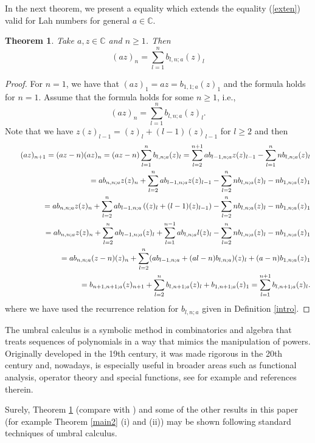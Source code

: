 \documentclass[a4paper,12pt]{amsart}
\def\CC{\mathbb C}
\def\CC{\mathbb C}
\newtheorem{theorem}[thm]{Theorem}
\theoremstyle{definition}
\theoremstyle{remark}
\begin{document}
In the next theorem, we present a equality which extends the equality (\ref{exten}) valid for Lah numbers for general $a\in \CC.$


\begin{theorem}\label{main} Take $a,z\in \CC$ and $n\ge 1$. Then
$$
(az)_n= \sum_{l=1}^n b_{l,n;a}(z)_l
$$

\end{theorem}

\begin{proof}
For $n=1$, we have that $(az)_1=az=b_{1,1;a}(z)_1$ and the formula holds for $n=1$. Assume that the formula holds for some $n \ge 1$, i.e.,
\[
(az)_n= \sum_{l=1}^{n} b_{l,n;a} (z)_l.
\]
Note that we have $z(z)_{l-1}=(z)_l+(l-1)(z)_{l-1}$ for $l\ge 2$ and then
\begin{eqnarray*}
&\quad&(az)_{n+1}= (az-n)(az)_n=  ( a z-n) \sum_{l=1}^{n} b_{l,n;a} (z)_l=  \sum_{l=2}^{n+1} a b_{l-1,n;a}z (z)_{l-1}-\sum_{l=1}^{n} n b_{l,n;a} (z)_l \cr
&\quad&= a b_{n,n;a}z(z)_n+ \sum_{l=2}^{n} a b_{l-1,n;a}z (z)_{l-1}-\sum_{l=2}^{n} n b_{l,n;a} (z)_l -nb_{1,n;a} (z)_1\cr
&\quad&= a b_{n,n;a}z(z)_n+ \sum_{l=2}^{n} a b_{l-1,n;a}\left((z)_l+(l-1)(z)_{l-1}\right)-\sum_{l=2}^{n} n b_{l,n;a} (z)_l -nb_{1,n;a} (z)_1\cr
&\quad&= a b_{n,n;a}z(z)_n+ \sum_{l=2}^{n} a b_{l-1,n;a}(z)_l + \sum_{l=1}^{n-1}a b_{l,n;a} l(z)_{l}-\sum_{l=2}^{n} n b_{l,n;a} (z)_l -nb_{1,n;a} (z)_1\cr
&\quad&= a b_{n,n;a}(z-n)(z)_n+ \sum_{l=2}^{n}  (ab_{l-1,n;a} +(al-n) b_{l,n;a} )(z)_{l}+(a -n)b_{1,n;a} (z)_1\cr
&\quad&=  b_{n+1,n+1;a}(z)_{n+1}+ \sum_{l=2}^{n}  b_{l,n+1;a}(z)_{l}+b_{1,n+1;a} (z)_1= \sum_{l=1}^{n+1} b_{l,n+1;a} (z)_l.
\end{eqnarray*}
where we have used the  recurrence relation for $b_{l,n;a}$ given in Definition \ref{intro}.
\end{proof}

 The umbral calculus is a symbolic method in combinatorics and algebra that treats sequences of polynomials in a way that mimics the manipulation of powers. Originally developed in the 19th century, it was made rigorous in the 20th century and, nowadays, is especially useful  in broader areas such as functional analysis, operator theory and special functions, see for example \cite{CG, Roman} and references therein.

Surely, Theorem \ref{main} (compare with \cite[Section 8]{Roman}) and some of the other results in this paper (for example Theorem \ref{main2} (i) and (ii)) may be shown following standard techniques of umbral calculus.
\end{document}

